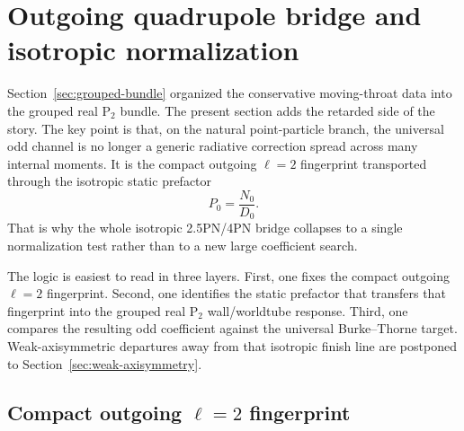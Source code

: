 \documentclass[11pt]{article}
\theoremstyle{definition}
\newcommand{\Ptwo}{\ensuremath{\mathrm{P}_2}}
\begin{document}
\section{Outgoing quadrupole bridge and isotropic normalization}
\label{sec:outgoing-normalization}

Section~\ref{sec:grouped-bundle} organized the conservative moving-throat data into the grouped real $\Ptwo$ bundle. The present section adds the retarded side of the story. The key point is that, on the natural point-particle branch, the universal odd channel is no longer a generic radiative correction spread across many internal moments. It is the compact outgoing $\ell=2$ fingerprint transported through the isotropic static prefactor
\[
P_0=\frac{N_0}{D_0}.
\]
That is why the whole isotropic 2.5PN/4PN bridge collapses to a single normalization test rather than to a new large coefficient search.

The logic is easiest to read in three layers. First, one fixes the compact outgoing $\ell=2$ fingerprint. Second, one identifies the static prefactor that transfers that fingerprint into the grouped real $\Ptwo$ wall/worldtube response. Third, one compares the resulting odd coefficient against the universal Burke--Thorne target. Weak-axisymmetric departures away from that isotropic finish line are postponed to Section~\ref{sec:weak-axisymmetry}.

\subsection{Compact outgoing \texorpdfstring{$\ell=2$}{ell=2} fingerprint}
\end{document}
